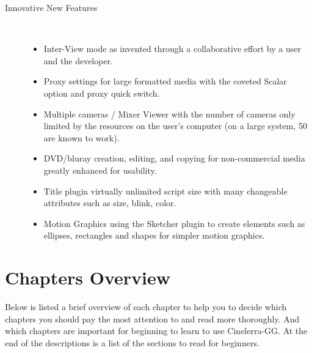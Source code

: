 \begin{description}
\begin{itemize}
            \end{itemize}
            \item[Innovative New Features] ~\\
                \begin{itemize}
                    \item Inter-View mode as invented through a collaborative effort by a user and the developer.
                    \item Proxy settings for large formatted media with the coveted Scalar option and proxy quick switch.
                    \item Multiple cameras / Mixer Viewer with the number of cameras only limited by the resources on the user’s computer (on a large system, 50 are known to work).
                    \item DVD/bluray creation, editing, and copying for non-commercial media greatly enhanced for usability.
                    \item Title plugin virtually unlimited script size with many changeable attributes such as size, blink, color.
                    \item Motion Graphics using the Sketcher plugin to create elements such as ellipses, rectangles and shapes for simpler motion graphics.
                \end{itemize}
\end{description}

\section{Chapters Overview}%
\label{sec:chapters_overview}

Below is listed a brief overview of each chapter to help you to decide which chapters you should pay the most attention to and read more thoroughly. 
And which chapters are important for beginning to learn to use Cinelerra-GG. At the end of the descriptions is a list of the sections to read for beginners.

